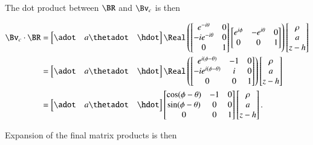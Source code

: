 {The dot product between \(\BR\) and \(\Bv_c\) is then

\begin{equation}\label{eqn:relativisticElectrodynamicsExamReflection:1250}
\begin{aligned}
\Bv_c \cdot \BR
&=
\begin{bmatrix}
\adot &
a \thetadot &
\hdot
\end{bmatrix}
\Real \left(
\begin{bmatrix}
e^{-i\theta}  & 0 \\
-i e^{-i\theta}  & 0 \\
0 & 1
\end{bmatrix}
\begin{bmatrix}
e^{i\phi} & -e^{i\theta} & 0 \\
0 & 0 & 1
\end{bmatrix}
\right)
\begin{bmatrix}
\rho \\
a \\
z - h
\end{bmatrix} \\
&=
\begin{bmatrix}
\adot &
a \thetadot &
\hdot
\end{bmatrix}
\Real \left(
\begin{bmatrix}
e^{i(\phi - \theta)} & -1 & 0  \\
-i e^{i(\phi - \theta)} & i & 0 \\
0 & 0 & 1
\end{bmatrix}
\right)
\begin{bmatrix}
\rho \\
a \\
z - h
\end{bmatrix} \\
&=
\begin{bmatrix}
\adot &
a \thetadot &
\hdot
\end{bmatrix}
\begin{bmatrix}
\cos(\phi - \theta) & -1 & 0  \\
\sin(\phi - \theta) & 0 & 0 \\
0 & 0 & 1
\end{bmatrix}
\begin{bmatrix}
\rho \\
a \\
z - h
\end{bmatrix}.
\end{aligned}
\end{equation}

Expansion of the final matrix products is then

}

